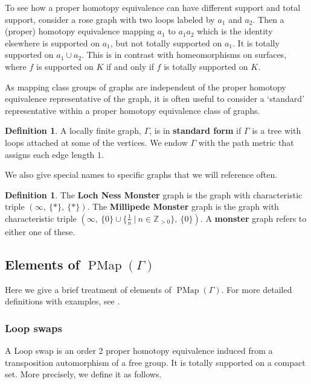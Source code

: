 \documentclass[11pt]{amsart}
\theoremstyle{plain}
\theoremstyle{definition}
\newtheorem{DEF}[THM]{Definition}
\DeclareMathOperator{\PMap}{PMap}
\newcommand{\Z}{\mathbb{Z}}
\def\G{{\Gamma}}
\newcommand{\<}{\langle}
\renewcommand{\>}{\rangle}
\begin{document}
To see how a proper homotopy equivalence can have different support and total support, consider a rose graph with two loops labeled by $a_1$ and $a_2$. Then a (proper) homotopy equivalence mapping $a_1$ to $a_1a_2$ which is the identity elsewhere is supported on $a_1$, but not totally supported on $a_1$. It is totally supported on $a_1 \cup a_2$.
This is in contrast with homeomorphisms on surfaces, where $f$ is supported on $K$ if and only if $f$ is totally supported on $K$. 

As mapping class groups of graphs are independent of the proper homotopy equivalence representative of the graph, it is often useful to consider a `standard' representative within a proper homotopy equivalence class of graphs.
\begin{DEF}\label{def:standardForm}
    A locally finite graph, $\G$, is in \textbf{standard form} if $\G$ is a tree with loops attached at some of the vertices. We endow $\G$ with the path metric that assigns each edge length $1$.
\end{DEF}

We also give special names to specific graphs that we will reference often.

\begin{DEF} \label{def:monsters}
    The \textbf{Loch Ness Monster} graph is the graph with characteristic triple $(\infty,\ \{*\},\ \{*\})$. The \textbf{Millipede Monster} graph is the graph with characteristic triple $(\infty,\ \{0\} \cup \{\frac{1}{n}\ |\ n \in \Z_{>0}\},\ \{0\})$. A \textbf{monster} graph refers to either one of these. 
\end{DEF}

\subsection{Elements of $\PMap(\G)$} \label{ssec:elements}
Here we give a brief treatment of elements of $\PMap(\G)$. For more detailed definitions with examples, see \cite[Section 3]{DHK2023}.

\subsubsection{Loop swaps}
   A Loop swap is an order 2 proper homotopy equivalence induced from a transposition automorphism of a free group. It is totally supported on a compact set. More precisely, we define it as follows.
\end{document}
